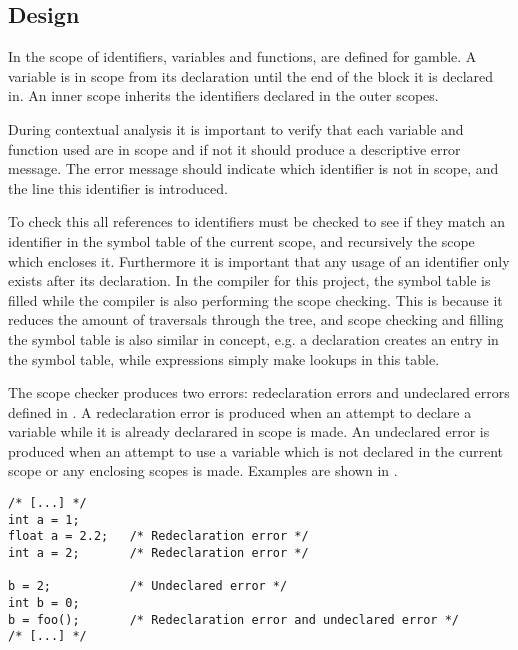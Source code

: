 \subsection*{Design}
In  the scope of identifiers, variables and functions, are defined for \gls{gamble}.
A variable is in scope from its declaration until the end of the block it is declared in.
An inner scope inherits the identifiers declared in the outer scopes. 

During contextual analysis it is important to verify that each variable and function used are in scope and if not it should produce a descriptive error message.
The error message should indicate which identifier is not in scope, and the line this identifier is introduced.

To check this all references to identifiers must be checked to see if they match an identifier in the symbol table of the current scope, and recursively the scope which encloses it. 
Furthermore it is important that any usage of an identifier only exists after its declaration.
In the compiler for this project, the symbol table is filled while the compiler is also performing the scope checking.
This is because it reduces the amount of traversals through the tree, and scope checking and filling the symbol table is also similar in concept, e.g. a declaration creates an entry in the symbol table, while expressions simply make lookups in this table.

The scope checker produces two errors: redeclaration errors and undeclared errors defined in .
A redeclaration error is produced when an attempt to declare a variable while it is already declarared in scope is made.
An undeclared error is produced when an attempt to use a variable which is not declared in the current scope or any enclosing scopes is made. 
Examples are shown in .

\begin{lstlisting}[caption=Examples of scope errors in \gls{gamble}, numbers=none,frame=tlrb,label={lst:scopeErrors}]
/* [...] */
int a = 1;
float a = 2.2;   /* Redeclaration error */
int a = 2;       /* Redeclaration error */ 

b = 2;           /* Undeclared error */   
int b = 0;
b = foo();       /* Redeclaration error and undeclared error */ 
/* [...] */
\end{lstlisting}

